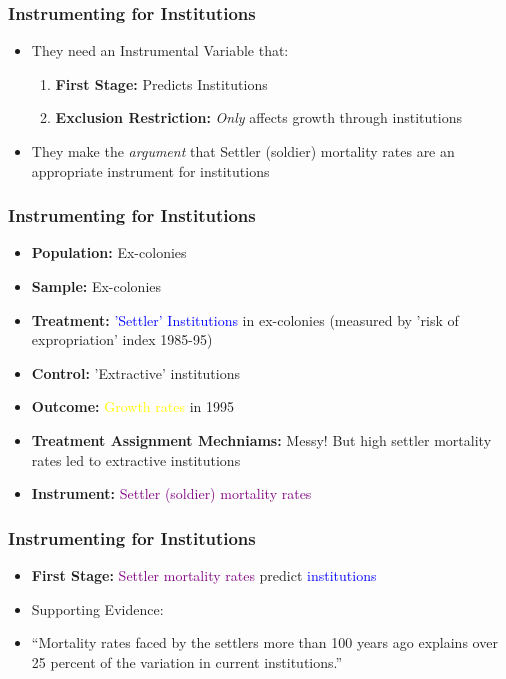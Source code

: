 \documentclass[xcolor=x11names,compress]{beamer}\usepackage[]{graphicx}\usepackage[]{color}
\renewcommand{\(}{\begin{columns}}
\renewcommand{\)}{\end{columns}}
\newcommand{\<}[1]{\begin{column}{#1}}
\renewcommand{\>}{\end{column}}
\begin{document}
\begin{frame}
\frametitle{Instrumenting for Institutions}
\begin{itemize}
\item They need an Instrumental Variable that:
\pause
\begin{enumerate}
\item \textbf{First Stage:} \pause Predicts Institutions
\pause
\item \textbf{Exclusion Restriction:} \pause \textit{Only} affects growth through institutions
\end{enumerate}
\pause
\item They make the \textit{argument} that Settler (soldier) mortality rates are an appropriate instrument for institutions
\end{itemize}
\end{frame}


\begin{frame}
\frametitle{Instrumenting for Institutions}
\begin{itemize}
\item \textbf{Population:} \pause Ex-colonies
\pause
\item \textbf{Sample:} \pause Ex-colonies
\pause
\item \textbf{Treatment:} \pause \textcolor{blue}{'Settler' Institutions} in ex-colonies (measured by 'risk of expropriation' index 1985-95)
\pause
\item \textbf{Control:} \pause 'Extractive' institutions
\pause
\item \textbf{Outcome:} \pause \textcolor{yellow}{Growth rates} in 1995
\pause
\item \textbf{Treatment Assignment Mechniams:} \pause Messy! But high settler mortality rates led to extractive institutions
\pause
\item \textbf{Instrument:} \pause \textcolor{purple}{Settler (soldier) mortality rates}
\end{itemize}
\end{frame}

\begin{frame}
\frametitle{Instrumenting for Institutions}
\begin{itemize}
\item \textbf{First Stage:} \pause \textcolor{purple}{Settler mortality rates} predict \textcolor{blue}{institutions}
\pause
\item Supporting Evidence:
\pause
\item ``Mortality rates faced by the settlers more than 100 years ago explains over 25 percent of the variation in current institutions.''
\end{itemize}
\end{frame}
\end{document}
